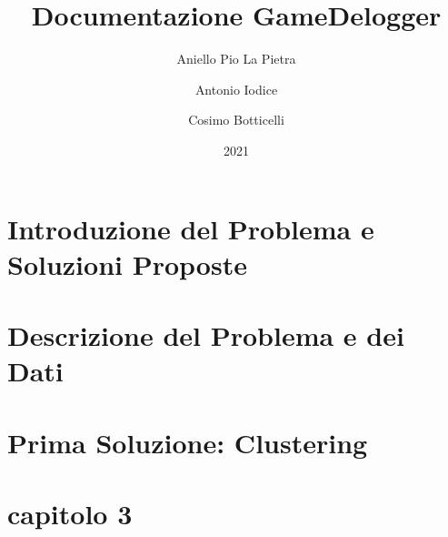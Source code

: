 \documentclass[12pt]{report}
\title{Documentazione GameDelogger}
\author{Aniello Pio La Pietra \and Antonio Iodice \and Cosimo Botticelli}
\date{2021}
\begin{document}
\maketitle
\tableofcontents


\chapter{Introduzione del Problema e Soluzioni Proposte}


\chapter{Descrizione del Problema e dei Dati}


\chapter{Prima Soluzione: Clustering}


\chapter{capitolo 3}

\end{document}
